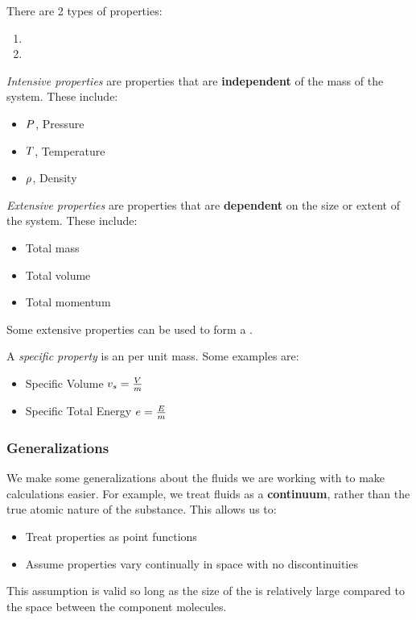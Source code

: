 There are 2 types of properties:
\begin{enumerate}[noitemsep]
\item {}
\item {}
\end{enumerate}

\begin{definition}\label{def:Intensive_Property}
  \emph{Intensive properties} are properties that are \textbf{independent} of the mass of the system.
  These include:
  \begin{itemize}[noitemsep]
  \item $P$, Pressure
  \item $T$, Temperature
  \item $\rho$, Density
  \end{itemize}
\end{definition}

\begin{definition}\label{def:Extensive_Property}
  \emph{Extensive properties} are properties that are \textbf{dependent} on the size or extent of the system.
  These include:
  \begin{itemize}[noitemsep]
  \item Total mass
  \item Total volume
  \item Total momentum
  \end{itemize}
\end{definition}

Some extensive properties can be used to form a .
\begin{definition}\label{def:Specific_Property}
  A \emph{specific property} is an  per unit mass.
  Some examples are:
  \begin{itemize}[noitemsep]
  \item Specific Volume $v_{s} = \frac{V}{m}$
  \item Specific Total Energy $e = \frac{E}{m}$
  \end{itemize}
\end{definition}

\subsubsection{Generalizations}\label{subsubsec:Generalizations}
We make some generalizations about the fluids we are working with to make calculations easier.
For example, we treat fluids as a \textbf{continuum}, rather than the true atomic nature of the substance.
This allows us to:
\begin{itemize}[noitemsep]
\item Treat properties as point functions
\item Assume properties vary continually in space with no discontinuities
\end{itemize}

This assumption is valid so long as the size of the  is relatively large compared to the space between the component molecules.


